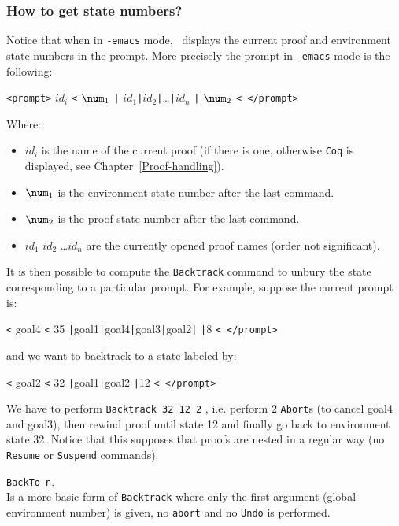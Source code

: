 \subsubsection{How to get state numbers?}
\label{sec:statenums}


Notice that when in \texttt{-emacs} mode, \Coq\ displays the current
proof and environment state numbers in the prompt. More precisely the
prompt in \texttt{-emacs} mode is the following:

\verb!<prompt>! \emph{$id_i$} \verb!<! $\num_1$
\verb!|! $id_1$\verb!|!$id_2$\verb!|!\dots\verb!|!$id_n$
\verb!|! $\num_2$ \verb!< </prompt>!

Where:

\begin{itemize}
\item \emph{$id_i$} is the name of the current proof (if there is
  one, otherwise \texttt{Coq} is displayed, see
Chapter~\ref{Proof-handling}).
\item $\num_1$ is the environment state number after the last
  command.
\item $\num_2$ is the proof state number after the last
  command.
\item $id_1$ $id_2$ \dots $id_n$ are the currently opened proof names
  (order not significant).
\end{itemize}

It is then possible to compute the \texttt{Backtrack} command to
unbury the state corresponding to a particular prompt. For example,
suppose the current prompt is:

\verb!<! goal4 \verb!<! 35
\verb!|!goal1\verb!|!goal4\verb!|!goal3\verb!|!goal2\verb!|! 
\verb!|!8 \verb!< </prompt>!

and we want to backtrack to a state labeled by:

\verb!<! goal2 \verb!<! 32
\verb!|!goal1\verb!|!goal2
\verb!|!12 \verb!< </prompt>!

We have to perform \verb!Backtrack 32 12 2! , i.e. perform 2
\texttt{Abort}s (to cancel goal4 and goal3), then rewind proof until
state 12 and finally go back to environment state 32. Notice that this
supposes that proofs are nested in a regular way (no \texttt{Resume} or
\texttt{Suspend} commands).

\begin{Variants}
\item {\tt BackTo n}. \\
  Is a more basic form of \texttt{Backtrack} where only the first
  argument (global environment number) is given, no \texttt{abort} and
  no \texttt{Undo} is performed.
\end{Variants}


